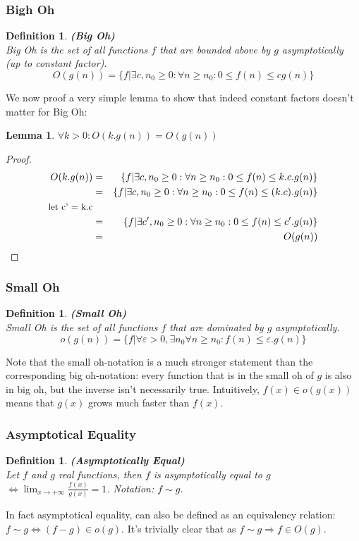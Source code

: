 \documentclass[a4paper,11pt]{report}
\newtheorem{lemma}[theorem]{Lemma}
\newtheorem{definition}[theorem]{Definition}
\begin{document}
\subsubsection{Bigh Oh}
\begin{definition}\textbf{(Big Oh)}\\
Big Oh is the set of all functions $f$ that are bounded above by $g$ asymptotically (up to constant factor).
$$O(g(n)) = \{f|\exists c, n_0 \geq 0: \forall n \geq n_0 : 0 \leq f(n) \leq cg(n)\}$$
\end{definition}
We now proof a very simple lemma to show that indeed constant factors doesn't matter for Big Oh:
\begin{lemma}\label{constanten}
$\forall k > 0: O(k.g(n)) = O(g(n))$
\end{lemma}

\begin{proof}
\begin{eqnarray*}
O(k.g(n)) &=& \{f|\exists c, n_0 \geq 0: \forall n \geq n_0 : 0 \leq f(n) \leq k.c.g(n)\}\\
&=& \{f|\exists c, n_0 \geq 0: \forall n \geq n_0 : 0 \leq f(n) \leq (k.c).g(n)\}\\
\text{\small{let c' = k.c}}\\
&=& \{f|\exists c', n_0 \geq 0: \forall n \geq n_0 : 0 \leq f(n) \leq c'.g(n)\}\\
&=& O(g(n))
\end{eqnarray*}
\end{proof}



\subsubsection{Small Oh}
\begin{definition}\textbf{(Small Oh)}\\
Small Oh is the set of all functions $f$ that are dominated by $g$ asymptotically.
$$o(g(n)) = \{f|\forall \varepsilon > 0, \exists n_0 \forall n \geq n_0: f(n) \leq \varepsilon.g(n)\}$$
\end{definition}
Note that the small oh-notation is a much stronger statement than the corresponding big oh-notation: every function that is in the small oh of $g$ is also in big oh, but the inverse isn't necessarily true. Intuitively, $f(x) \in o(g(x))$ means that $g(x)$ grows much faster than $f(x)$.

\subsubsection{Asymptotical Equality}
\begin{definition}\textbf{(Asymptotically Equal)}\\
Let $f$ and $g$ real functions, then $f$ is asymptotically equal to $g$ $\Leftrightarrow \displaystyle\lim_{x\rightarrow +\infty} \frac{f(x)}{g(x)}=1$. Notation: $f \sim g$.
\end{definition}
In fact asymptotical equality, can also be defined as an equivalency relation: $f\sim g \Leftrightarrow (f-g) \in o(g)$. It's trivially clear that as $f\sim g \Rightarrow f \in O(g)$.
\end{document}
